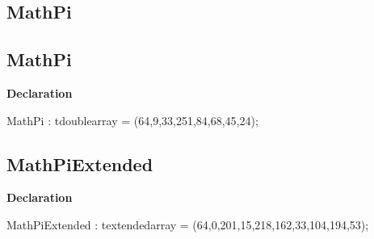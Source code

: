 \documentclass{report}
\newif\ifpdf
\begin{document}
\subsection*{\large{\textbf{MathPi}}\normalsize\hspace{1ex}\hrulefill}
\else
\subsection*{MathPi}
\fi
\label{ok_if_directive-MathPi}
\begin{list}{}{
\setlength{\itemindent}{0cm}
\setlength{\listparindent}{0cm}
\setlength{\leftmargin}{\evensidemargin}
\addtolength{\leftmargin}{\tmplength}
\settowidth{\labelsep}{X}
\addtolength{\leftmargin}{\labelsep}
\setlength{\labelwidth}{\tmplength}
}
\item[\textbf{Declaration}\hfill]
\ifpdf
\begin{flushleft}
\fi
\begin{ttfamily}
MathPi : tdoublearray =  (64,9,33,251,84,68,45,24);\end{ttfamily}

\ifpdf
\end{flushleft}
\fi

\end{list}
\ifpdf
\subsection*{\large{\textbf{MathPiExtended}}\normalsize\hspace{1ex}\hrulefill}
\else
\subsection*{MathPiExtended}
\fi
\label{ok_if_directive-MathPiExtended}
\begin{list}{}{
\setlength{\itemindent}{0cm}
\setlength{\listparindent}{0cm}
\setlength{\leftmargin}{\evensidemargin}
\addtolength{\leftmargin}{\tmplength}
\settowidth{\labelsep}{X}
\addtolength{\leftmargin}{\labelsep}
\setlength{\labelwidth}{\tmplength}
}
\item[\textbf{Declaration}\hfill]
\ifpdf
\begin{flushleft}
\fi
\begin{ttfamily}
MathPiExtended : textendedarray = (64,0,201,15,218,162,33,104,194,53);\end{ttfamily}

\ifpdf
\end{flushleft}
\fi

\end{list}
\ifpdf
\end{document}
